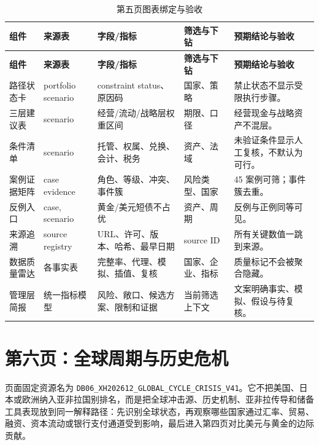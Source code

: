 \documentclass[UTF8,fontset=windows,12pt,openany]{ctexbook}
\newcommand{\Field}[1]{{\small\nolinkurl{#1}}}
\begin{document}
\clearpage
\begin{landscape}
\begin{longtable}{p{3.3cm}p{3.6cm}p{4.4cm}p{3.1cm}p{4.5cm}}
\caption{第五页图表绑定与验收}\label{tab:page5-map}\\
\toprule
\textbf{组件} & \textbf{来源表} & \textbf{字段/指标} & \textbf{筛选与下钻} & \textbf{预期结论与验收}\\
\midrule
\endfirsthead
\toprule \textbf{组件} & \textbf{来源表} & \textbf{字段/指标} & \textbf{筛选与下钻} & \textbf{预期结论与验收}\\ \midrule
\endhead
路径状态卡 & portfolio scenario & constraint status、原因码 & 国家、策略 & 禁止状态不显示受限执行步骤。\\
三层建议表 & scenario & 经营/流动/战略层权重区间 & 期限、口径 & 经营现金与战略资产不混层。\\
条件清单 & scenario & 托管、权属、兑换、会计、税务 & 资产、法域 & 未验证条件显示人工复核，不默认为可行。\\
案例证据矩阵 & case evidence & 角色、等级、冲突、事件簇 & 风险类型、国家 & 45 案例可筛；事件簇去重。\\
反例入口 & case, scenario & 黄金/美元短债不占优 & 资产、周期 & 反例与正例同等可见。\\
来源追溯 & source registry & URL、许可、版本、哈希、最早日期 & source ID & 所有关键数值一跳到来源。\\
数据质量雷达 & 各事实表 & 完整率、代理、模拟、插值、复核 & 国家、企业、指标 & 质量标记不会被聚合隐藏。\\
管理层简报 & 统一指标模型 & 风险、敞口、候选方案、限制和证据 & 当前筛选上下文 & 文案明确事实、模拟、假设与待复核。\\
\bottomrule
\end{longtable}
\end{landscape}

\chapter{第六页：全球周期与历史危机}

页面固定资源名为 \Field{DB06_XH202612_GLOBAL_CYCLE_CRISIS_V41}。它不把美国、日本或欧洲纳入亚非拉国别排名，而是把全球冲击源、历史机制、亚非拉传导和储备工具表现放到同一解释路径：先识别全球状态，再观察哪些国家通过汇率、贸易、融资、资本流动或银行支付通道受到影响，最后进入第四页对比美元与黄金的边际贡献。
\end{document}

